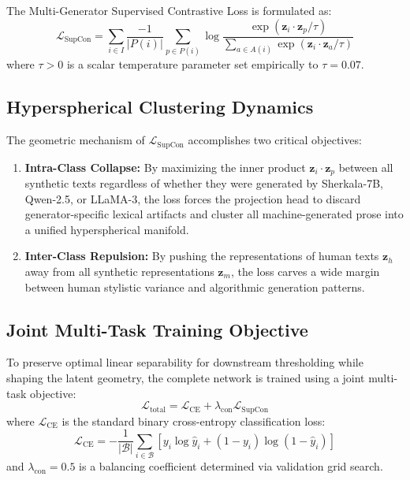 The Multi-Generator Supervised Contrastive Loss is formulated as:
\begin{equation}
    \label{eq:supcon_loss}
    \mathcal{L}_{\text{SupCon}} = \sum_{i \in I} \frac{-1}{|P(i)|} \sum_{p \in P(i)} \log \frac{\exp(\mathbf{z}_i \cdot \mathbf{z}_p / \tau)}{\sum_{a \in A(i)} \exp(\mathbf{z}_i \cdot \mathbf{z}_a / \tau)}
\end{equation}
where $\tau > 0$ is a scalar temperature parameter set empirically to $\tau = 0.07$.

\subsection{Hyperspherical Clustering Dynamics}
The geometric mechanism of $\mathcal{L}_{\text{SupCon}}$ accomplishes two critical objectives:
\begin{enumerate}
    \item \textbf{Intra-Class Collapse:} By maximizing the inner product $\mathbf{z}_i \cdot \mathbf{z}_p$ between all synthetic texts regardless of whether they were generated by Sherkala-7B, Qwen-2.5, or LLaMA-3, the loss forces the projection head to discard generator-specific lexical artifacts and cluster all machine-generated prose into a unified hyperspherical manifold.
    \item \textbf{Inter-Class Repulsion:} By pushing the representations of human texts $\mathbf{z}_h$ away from all synthetic representations $\mathbf{z}_m$, the loss carves a wide margin between human stylistic variance and algorithmic generation patterns.
\end{enumerate}

\subsection{Joint Multi-Task Training Objective}
To preserve optimal linear separability for downstream thresholding while shaping the latent geometry, the complete network is trained using a joint multi-task objective:
\begin{equation}
    \label{eq:joint_objective}
    \mathcal{L}_{\text{total}} = \mathcal{L}_{\text{CE}} + \lambda_{\text{con}} \mathcal{L}_{\text{SupCon}}
\end{equation}
where $\mathcal{L}_{\text{CE}}$ is the standard binary cross-entropy classification loss:
\begin{equation}
    \mathcal{L}_{\text{CE}} = - \frac{1}{|\mathcal{B}|} \sum_{i \in \mathcal{B}} \left[y_i \log \hat{y}_i + (1 - y_i) \log (1 - \hat{y}_i)\right]
\end{equation}
and $\lambda_{\text{con}} = 0.5$ is a balancing coefficient determined via validation grid search.

